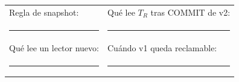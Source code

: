 \documentclass[variant=guia,cover=none,mode=print]{ua-engineering-v6-article}
\begin{document}
\vspace{0.5cm}

\begin{tabular}{p{}p{}}
Regla de snapshot: & Qué lee $T_R$ tras COMMIT de v2: \\
\rule{0.42\textwidth}{0.4pt} & \rule{0.42\textwidth}{0.4pt} \\[0.9cm]
Qué lee un lector nuevo: & Cuándo v1 queda reclamable: \\
\rule{0.42\textwidth}{0.4pt} & \rule{0.42\textwidth}{0.4pt} \\
\end{tabular}
\end{document}
